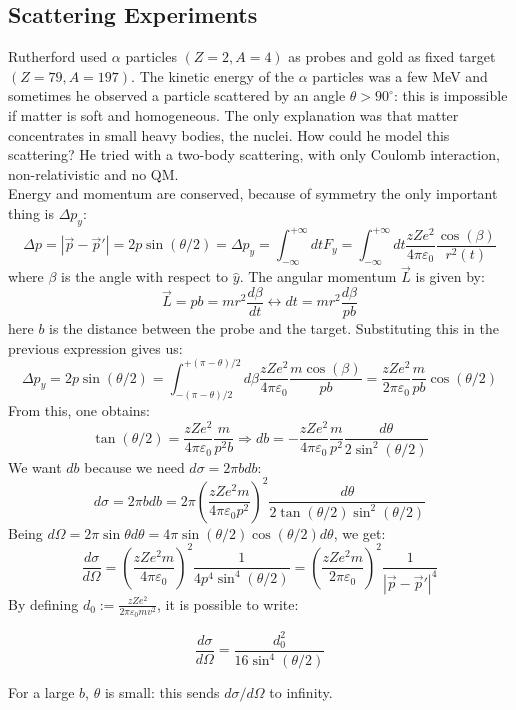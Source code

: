 \documentclass[10.75pt,a4paper,openright,bottom=2cm]{article}
\begin{document}
\subsection{Scattering Experiments}
Rutherford used $\alpha$ particles $(Z=2,A=4)$ as probes and gold as fixed target $(Z=79, A=197)$. The kinetic energy of the $\alpha$ particles was a few MeV and sometimes he observed a particle scattered by an angle $\theta>90^\circ$: this is impossible if matter is soft and homogeneous. The only explanation was that matter concentrates in small heavy bodies, the nuclei. How could he model this scattering? He tried with a two-body scattering, with only Coulomb interaction, non-relativistic and no QM.\\
Energy and momentum are conserved, because of symmetry the only important thing is $\Delta p_y$:
\[
\Delta p=|\Vec{p}-\Vec{p}'|=2p\sin(\theta/2)=\Delta p_y=\int_{-\infty}^{+\infty}dtF_y=\int_{-\infty}^{+\infty}dt\frac{zZe^2}{4\pi\varepsilon_0}\frac{\cos(\beta)}{r^2(t)}
\]
where $\beta$ is the angle with respect to $\hat{y}$. The angular momentum $\Vec{L}$ is given by:
\[
\Vec{L}=pb=mr^2\frac{d\beta}{dt}\leftrightarrow dt=mr^2\frac{d\beta}{pb}
\]
here $b$ is the distance between the probe and the target. Substituting this in the previous expression gives us:
\[
\Delta p_y=2p\sin(\theta/2)=\int_{-(\pi-\theta)/2}^{+(\pi-\theta)/2}d\beta\frac{zZe^2}{4\pi\varepsilon_0}\frac{m\cos(\beta)}{pb}=\frac{zZe^2}{2\pi\varepsilon_0}\frac{m}{pb}\cos(\theta/2)
\]
From this, one obtains:
\[
\tan(\theta/2)=\frac{zZe^2}{4\pi\varepsilon_0}\frac{m}{p^2b}\Rightarrow db=-\frac{zZe^2}{4\pi\varepsilon_0}\frac{m}{p^2}\frac{d\theta}{2\sin^2(\theta/2)}
\]
We want $db$ because we need $d\sigma=2\pi bdb$:
\[
d\sigma=2\pi bdb=2\pi\left(\frac{zZe^2m}{4\pi\varepsilon_0p^2}\right)^2\frac{d\theta}{2\tan(\theta/2)\sin^2(\theta/2)}
\]
Being $d\Omega=2\pi\sin\theta d\theta=4\pi\sin(\theta/2)\cos(\theta/2)d\theta$, we get:
\[
\frac{d\sigma}{d\Omega}=\left(\frac{zZe^2m}{4\pi\varepsilon_0}\right)^2\frac{1}{4p^4\sin^4(\theta/2)}=\left(\frac{zZe^2m}{2\pi\varepsilon_0}\right)^2\frac{1}{|\Vec{p}-\Vec{p}'|^4}
\]
By defining $d_0:=\frac{zZe^2}{2\pi\varepsilon_0mv^2}$, it is possible to write:
\begin{tcolorbox}[width=\textwidth,colback={yellow!50},title={Rutherford Scattering},colbacktitle={gray!50},coltitle=black]
\[
\frac{d\sigma}{d\Omega}=\frac{d_0^2}{16\sin^4(\theta/2)}
\]
\end{tcolorbox}
\noindent
For a large $b$, $\theta$ is small: this sends $d\sigma/d\Omega$ to infinity.\\
\end{document}
